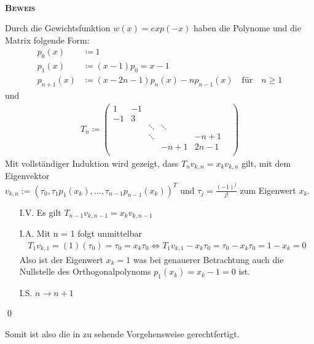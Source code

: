 \documentclass[12pt,a4paper]{scrartcl}
\numberwithin{equation}{section}
\numberwithin{myalgctr}{section}
\numberwithin{mytheoremctr}{subsection}
\numberwithin{mykorollarctr}{subsection}
\numberwithin{mylemmactr}{subsection}
\numberwithin{mybeispielctr}{subsection}
\newenvironment{myproof}{%
	\bigskip\noindent%
	\textsc{\textbf{\\Beweis\\}}%
	\indent
}{\qed\par\bigskip}  %
\begin{document}
	\begin{myproof}
				Durch die Gewichtsfunktion $w(x) = exp(-x)$ haben die Polynome und die Matrix folgende Form:	
		\begin{align*}	
		p_0(x) &\coloneqq 1\\	
		p_1(x) &\coloneqq (x-1) p_0 = x-1 \\	
		p_{n+1}(x) &\coloneqq (x-2n-1)p_n(x)-n p_{n-1}(x) \quad \text{f\"ur}  \quad n\geq 1	
		\end{align*} 	
		und 	
		\begin{align*}	
		T_n\coloneqq 	
		\begin{pmatrix}	
		1 		     & 	-1			 	&  				  & &\\	
		-1		 	 & 3				& 			   	  & & \\	
		&   		 & \ddots 		    & \ddots 			&\\	
		&					& \ddots 	&					& -n+1\\	
		&		&			&-n+1 		&2n-1				&\\	
		\end{pmatrix}	
		\end{align*}	
		Mit vollständiger Induktion wird gezeigt, dass $T_nv_{k,n} = x_kv_{k,n}$ gilt, mit dem Eigenvektor\\	
		$v_{k,n} := (\tau_0,\tau_1p_1(x_k),\ldots,\tau_{n-1}p_{n-1}(x_k))^{T}$ und $\tau_j = \frac{(-1)^{j}}{j!}$ zum Eigenwert $x_k$.	
		\begin{itemize}	
			\item[I.V.] 	
			Es gilt $T_{n-1}v_{k,n-1} = x_kv_{k,n-1}$	
			\item[I.A.] 	
			Mit n = 1 folgt unmittelbar	
			\begin{align*}	
			T_1v_{k,1} = (1)(\tau_0) = \tau_0 = x_k\tau_0 \Leftrightarrow T_1v_{k,1} - x_k\tau_0 = \tau_0 - x_k\tau_0 = 1 - x_k = 0	
			\end{align*}	
			Also ist der Eigenwert $x_k = 1$ was bei genauerer Betrachtung auch die Nullstelle des Orthogonalpolynoms $p_1(x_k) = x_k - 1 = 0$ ist. 	
			\item[I.S.] $n \rightarrow n + 1$	
			
		\end{itemize}
	\end{myproof}
	\newpage
	Somit ist also die in  zu sehende Vorgehensweise gerechtfertigt.
	
	
	
\end{document}
